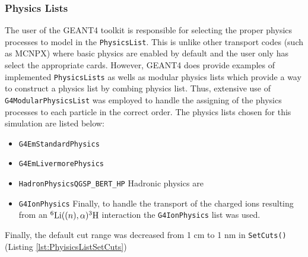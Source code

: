 \subsubsection{Physics Lists}
The user of the GEANT4 toolkit is responsible for selecting the proper physics processes to model in the \verb+PhysicsList+.
This is unlike other transport codes (such as MCNPX) where basic physics are enabled by default and the user only has select the appropriate cards.
However, GEANT4 does provide examples of implemented \verb+PhysicsLists+ as wells as modular physics lists which provide a way to construct a physics list by combing physics list.
Thus, extensive use of \verb+G4ModularPhysicsList+ was employed to handle the assigning of the physics processes to each particle in the correct order.
The physics lists chosen for this simulation are listed below:
\begin{itemize}
    \item \verb+G4EmStandardPhysics+
    \item \verb+G4EmLivermorePhysics+
    \item \verb+HadronPhysicsQGSP_BERT_HP+ Hadronic physics are
    \item \verb+G4IonPhysics+ Finally, to handle the transport of the charged ions resulting from an ${}^6\text{Li}(\text(n),\alpha){}^{3}\text{H}$ interaction the \verb+G4IonPhysics+ list was used.
\end{itemize}

Finally, the default cut range was decreased from 1 cm to 1 nm in \verb+SetCuts()+ (Listing \ref{lst:PhyisicsListSetCuts}) 



